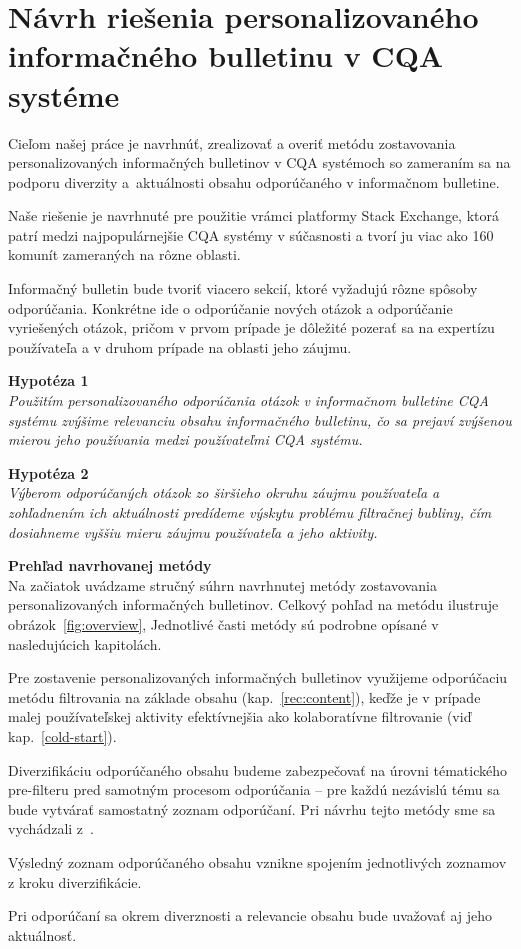 \afterpage{\blankpage}
\newpage
\chapter{Návrh riešenia personalizovaného informačného bulletinu v CQA systéme}

Cieľom našej práce je navrhnúť, zrealizovať a overiť metódu zostavovania personalizovaných informačných bulletinov v CQA systémoch
so zameraním sa na podporu diverzity a~aktuálnosti obsahu odporúčaného v informačnom bulletine.

Naše riešenie je navrhnuté pre použitie vrámci platformy Stack Exchange, ktorá patrí medzi najpopulárnejšie CQA systémy
v súčasnosti a tvorí ju viac ako 160 komunít zameraných na rôzne oblasti.

Informačný bulletin bude tvoriť viacero sekcií, ktoré vyžadujú rôzne spôsoby odporúčania. Konkrétne ide o odporúčanie
nových otázok a odporúčanie vyriešených otázok, pričom v prvom prípade je dôležité pozerať sa na expertízu používateľa
a v druhom prípade na oblasti jeho záujmu.

\textbf{Hypotéza 1}\\
\textit{Použitím personalizovaného odporúčania otázok v informačnom bulletine CQA systému zvýšime relevanciu obsahu informačného
bulletinu, čo sa prejaví zvýšenou mierou jeho používania medzi používateľmi CQA systému.}

\textbf{Hypotéza 2}\\
\textit{Výberom odporúčaných otázok zo širšieho okruhu záujmu používateľa a zohľadnením ich aktuálnosti predídeme výskytu problému
filtračnej bubliny, čím dosiahneme vyššiu mieru záujmu používateľa a jeho aktivity.}

\textbf{Prehľad navrhovanej metódy}\\
Na začiatok uvádzame stručný súhrn navrhnutej metódy zostavovania personalizovaných informačných bulletinov.
Celkový pohľad na metódu ilustruje obrázok~\ref{fig:overview}, Jednotlivé časti metódy sú podrobne opísané v nasledujúcich kapitolách.
\begin{my_itemize}
\item{
    Pre zostavenie personalizovaných informačných bulletinov využijeme odporúčaciu metódu filtrovania na základe obsahu
    (kap.~\ref{rec:content}), keďže je v prípade malej používateľskej aktivity efektívnejšia ako kolaboratívne filtrovanie
    (viď kap.~\ref{cold-start}).
}
\item{
    Diverzifikáciu odporúčaného obsahu budeme zabezpečovať na úrovni tématického pre-filteru pred samotným procesom
    odporúčania -- pre každú nezávislú tému sa bude vytvárať samostatný zoznam odporúčaní.
    Pri návrhu tejto metódy sme sa vychádzali z~\cite{Szpektor2013}.
}
\item{Výsledný zoznam odporúčaného obsahu vznikne spojením jednotlivých zoznamov z kroku diverzifikácie.}
\item{Pri odporúčaní sa okrem diverznosti a relevancie obsahu bude uvažovať aj jeho aktuálnosť.}
\end{my_itemize}

